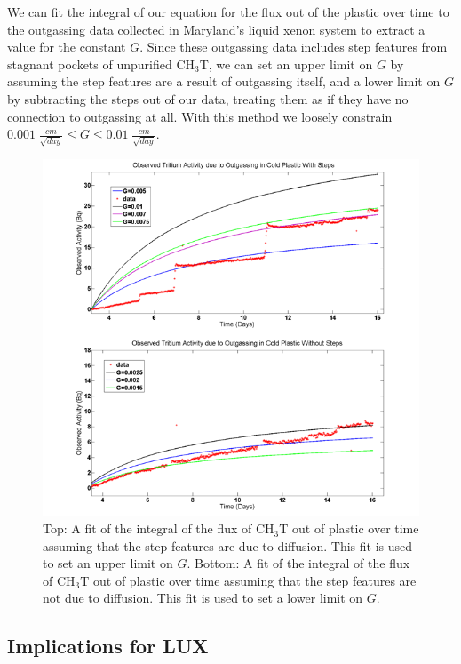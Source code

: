 We can fit the integral of our equation for the flux out of the plastic over time to the outgassing data collected in Maryland's liquid xenon system to extract a value for the constant $G$. Since these outgassing data includes step features from stagnant pockets of unpurified CH$_3$T, we can set an upper limit on $G$ by assuming the step features are a result of outgassing itself, and a lower limit on $G$ by subtracting the steps out of our data, treating them as if they have no connection to outgassing at all. With this method we loosely constrain $0.001 \; \frac{cm}{\sqrt{day}} \leq G \leq 0.01 \; \frac{cm}{\sqrt{day}}.$ 

\begin{figure}[H]
\centering
\includegraphics[scale=0.4]{StepsandNoSteps.png}
\caption{Top: A fit of the integral of the flux of CH$_3$T out of plastic over time assuming that the step features are due to diffusion.  This fit is used to set an upper limit on $G$.  Bottom: A fit of the integral of the flux of CH$_3$T out of plastic over time assuming that the step features are not due to diffusion.  This fit is used to set a lower limit on $G$. }
\label{fig:StepsFit}
\end{figure}

\subsection{Implications for LUX}

